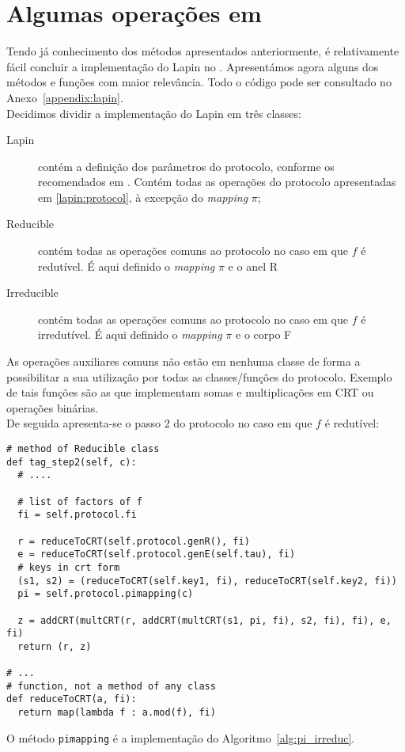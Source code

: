 \section{Algumas operações em \sage}
Tendo já conhecimento dos métodos apresentados anteriormente, é relativamente fácil concluir a implementação do Lapin no \sage. Apresentámos agora alguns dos métodos e funções com maior relevância. Todo o código pode ser consultado no Anexo~\ref{appendix:lapin}.\\
Decidimos dividir a implementação do Lapin em três classes:
\begin{description}
  \item[Lapin] contém a definição dos parâmetros do protocolo, conforme os recomendados em \cite{lapin}. Contém todas as operações do protocolo apresentadas em \ref{lapin:protocol}, à excepção do \textit{mapping} $\pi$;
  \item[Reducible] contém todas as operações comuns ao protocolo no caso em que $f$ é redutível. É aqui definido o \textit{mapping} $\pi$ e o anel \textsf{R}
  \item[Irreducible] contém todas as operações comuns ao protocolo no caso em que $f$ é irredutível. É aqui definido o \textit{mapping} $\pi$ e o corpo \textsf{F}
\end{description}
As operações auxiliares comuns não estão em nenhuma classe de forma a possibilitar a sua utilização por todas as classes/funções do protocolo. Exemplo de tais funções são as que implementam somas e multiplicações em CRT ou operações binárias.\\
De seguida apresenta-se o passo 2 do protocolo no caso em que $f$ é redutível:
\begin{lstlisting}[style=sage]
# method of Reducible class
def tag_step2(self, c):
  # ....
  
  # list of factors of f
  fi = self.protocol.fi

  r = reduceToCRT(self.protocol.genR(), fi)
  e = reduceToCRT(self.protocol.genE(self.tau), fi)
  # keys in crt form
  (s1, s2) = (reduceToCRT(self.key1, fi), reduceToCRT(self.key2, fi))
  pi = self.protocol.pimapping(c)

  z = addCRT(multCRT(r, addCRT(multCRT(s1, pi, fi), s2, fi), fi), e, fi)
  return (r, z)
  
# ...
# function, not a method of any class
def reduceToCRT(a, fi):
  return map(lambda f : a.mod(f), fi)
\end{lstlisting}
O método \verb|pimapping| é a implementação do Algoritmo~\ref{alg:pi_irreduc}.\\

